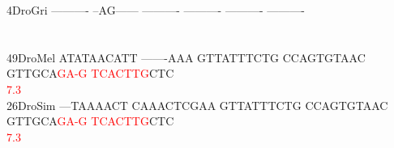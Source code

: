\documentclass[11pt,twoside,reqno,a4paper]{article}
\begin{document}
{4\hspace*{3\charwidth}DroGri	----------	--AG------	----------	----------	----------	----------	\\
\hspace*{4\charwidth}\hspace*{7\charwidth}\hspace*{1\charwidth}\hspace*{1\charwidth}\hspace*{1\charwidth}\hspace*{1\charwidth}\hspace*{1\charwidth}\hspace*{1\charwidth}\\
\\
49\hspace*{2\charwidth}DroMel	ATATAACATT	-------AAA	GTTATTTCTG	CCAGTGTAAC	GTTGCA\textcolor{Red}{G}\textcolor{Red}{A}\textcolor{Red}{-}\textcolor{Red}{G}	\textcolor{Red}{T}\textcolor{Red}{C}\textcolor{Red}{A}\textcolor{Red}{C}\textcolor{Red}{T}\textcolor{Red}{T}\textcolor{Red}{G}CTC	\\
\hspace*{4\charwidth}\hspace*{7\charwidth}\hspace*{1\charwidth}\hspace*{1\charwidth}\hspace*{1\charwidth}\hspace*{1\charwidth}\hspace*{46\charwidth}\textcolor{Red}{7.3}\hspace*{1\charwidth}\hspace*{1\charwidth}\\
26\hspace*{2\charwidth}DroSim	---TAAAACT	CAAACTCGAA	GTTATTTCTG	CCAGTGTAAC	GTTGCA\textcolor{Red}{G}\textcolor{Red}{A}\textcolor{Red}{-}\textcolor{Red}{G}	\textcolor{Red}{T}\textcolor{Red}{C}\textcolor{Red}{A}\textcolor{Red}{C}\textcolor{Red}{T}\textcolor{Red}{T}\textcolor{Red}{G}CTC	\\
\hspace*{4\charwidth}\hspace*{7\charwidth}\hspace*{1\charwidth}\hspace*{1\charwidth}\hspace*{1\charwidth}\hspace*{1\charwidth}\hspace*{46\charwidth}\textcolor{Red}{7.3}\hspace*{1\charwidth}\hspace*{1\charwidth}\\
}
\end{document}

